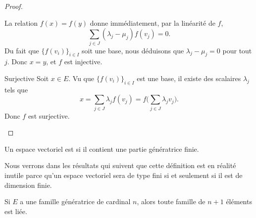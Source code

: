 \begin{proof}
\begin{subproof}
\begin{subproof}
			La relation \( f(x)=f(y)\) donne immédiatement, par la linéarité de \( f\),
			\begin{equation}
				\sum_{j\in J}(\lambda_j-\mu_j)f(v_j)=0.
			\end{equation}
			Du fait que \( \{ f(v_i) \}_{i\in I}\) soit une base, nous déduisons que \( \lambda_j-\mu_j=0\) pour tout \( j\). Donc \( x=y\), et \( f\) est injective.
			\item[Surjective]
			Soit \( x\in E\). Vu que \( \{ f(v_i) \}_{i\in I}\) est une base, il existe des scalaires \( \lambda_j\) tels que
			\begin{equation}
				x=\sum_{j\in J}\lambda_jf(v_j)=f\big( \sum_{j\in J}\lambda_jv_j \big).
			\end{equation}
			Donc \( f\) est surjective.
		\end{subproof}
	\end{subproof}
\end{proof}

\begin{definition}
	Un espace vectoriel est  si il contient une partie génératrice finie.
\end{definition}
Nous verrons dans les résultats qui suivent que cette définition est en réalité inutile parce qu'un espace vectoriel sera de type fini si et seulement si il est de dimension finie.

\begin{lemma}       \label{LemytHnlD}
	Si \( E\) a une famille génératrice de cardinal \( n\), alors toute famille de \( n+1\) éléments est liée.
\end{lemma}


